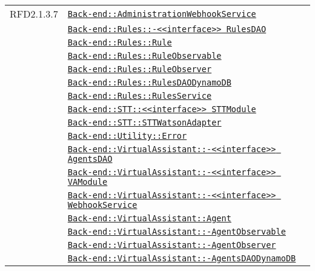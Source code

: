 \begin{longtable}{|>{\centering}m{3cm}|m{10cm}<{\centering}|}
RFD2.1.3.7 & \hyperref[Back-end::AdministrationWebhookService]{\texttt{Back-end::AdministrationWebhookService}}\\
& \hyperref[Back-end::Rules::<<interface>> RulesDAO]{\texttt{Back-end::Rules::-\linebreak <<interface>> RulesDAO}}\\
& \hyperref[Back-end::Rules::Rule]{\texttt{Back-end::Rules::Rule}}\\
& \hyperref[Back-end::Rules::RuleObservable]{\texttt{Back-end::Rules::RuleObservable}}\\
& \hyperref[Back-end::Rules::RuleObserver]{\texttt{Back-end::Rules::RuleObserver}}\\
& \hyperref[Back-end::Rules::RulesDAODynamoDB]{\texttt{Back-end::Rules::RulesDAODynamoDB}}\\
& \hyperref[Back-end::Rules::RulesService]{\texttt{Back-end::Rules::RulesService}}\\
& \hyperref[Back-end::STT::<<interface>> STTModule]{\texttt{Back-end::STT::<<interface>> STTModule}}\\
& \hyperref[Back-end::STT::STTWatsonAdapter]{\texttt{Back-end::STT::STTWatsonAdapter}}\\
& \hyperref[Back-end::Utility::Error]{\texttt{Back-end::Utility::Error}}\\
& \hyperref[Back-end::VirtualAssistant::<<interface>> AgentsDAO]{\texttt{Back-end::VirtualAssistant::-\linebreak <<interface>> AgentsDAO}}\\
& \hyperref[Back-end::VirtualAssistant::<<interface>> VAModule]{\texttt{Back-end::VirtualAssistant::-\linebreak <<interface>> VAModule}}\\
& \hyperref[Back-end::VirtualAssistant::<<interface>> WebhookService]{\texttt{Back-end::VirtualAssistant::-\linebreak <<interface>> WebhookService}}\\
& \hyperref[Back-end::VirtualAssistant::Agent]{\texttt{Back-end::VirtualAssistant::Agent}}\\
& \hyperref[Back-end::VirtualAssistant::AgentObservable]{\texttt{Back-end::VirtualAssistant::-\linebreak AgentObservable}}\\
& \hyperref[Back-end::VirtualAssistant::AgentObserver]{\texttt{Back-end::VirtualAssistant::-\linebreak AgentObserver}}\\
& \hyperref[Back-end::VirtualAssistant::AgentsDAODynamoDB]{\texttt{Back-end::VirtualAssistant::-\linebreak AgentsDAODynamoDB}}\\

\end{longtable}
